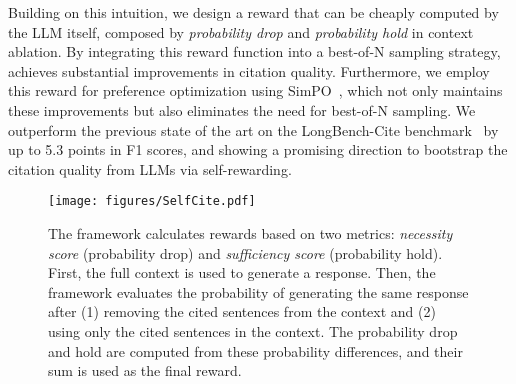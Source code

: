 Building on this intuition, we design a reward that can be cheaply computed by the LLM itself, composed by \emph{probability drop} and \emph{probability hold} in context ablation. 
By integrating this reward function into a best-of-N sampling strategy, \ours achieves substantial improvements in citation quality.
Furthermore, we employ this reward for preference optimization using SimPO~\citep{meng2024simpo}, which not only maintains these improvements but also eliminates the need for best-of-N sampling. We outperform the previous state of the art on the LongBench-Cite benchmark~\citep{zhang2024longcite} by up to 5.3 points in F1 scores, and showing a promising direction to bootstrap the citation quality from LLMs via self-rewarding.

\begin{figure}[!t]
\texttt{[image: figures/SelfCite.pdf]}
\caption{The \ours framework calculates rewards based on two metrics: \emph{necessity score} (probability drop) and \emph{sufficiency score} (probability hold). First, the full context is used to generate a response. Then, the framework evaluates the probability of generating the same response after (1) removing the cited sentences from the context and (2) using only the cited sentences in the context. The probability drop and hold are computed from these probability differences, and their sum is used as the final reward.}
\label{main-figure}
\end{figure}